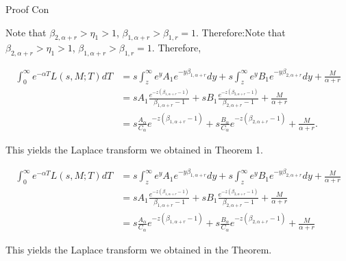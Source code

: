 \documentclass{beamer}
\begin{document}
\begin{frame}{Proof Con}

    {\footnotesize \footnotesize
    \par Note that \(\beta_{2,\alpha+r} > \eta_1 > 1\), \(\beta_{1,\alpha+r} > \beta_{1,r} = 1\). Therefore:Note that \(\beta_{2,\alpha+r} > \eta_1 > 1\), \(\beta_{1,\alpha+r} > \beta_{1,r} = 1\). Therefore,

\begin{align*}
\int_{0}^{\infty} e^{-\alpha T} L(s, M; T) dT 
&= s \int_{z}^{\infty} e^{y} A_1 e^{-y\beta_{1,\alpha+r}} dy + s \int_{z}^{\infty} e^{y} B_1 e^{-y\beta_{2,\alpha+r}} dy + \frac{M}{\alpha + r} \\
&= s A_1 \frac{e^{-z(\beta_{1,\alpha+r}-1)}}{\beta_{1,\alpha+r}-1} + s B_1 \frac{e^{-z(\beta_{2,\alpha+r}-1)}}{\beta_{2,\alpha+r}-1} + \frac{M}{\alpha + r} \\
&= s \frac{A_{\alpha}}{C_{\alpha}} e^{-z(\beta_{1,\alpha+r}-1)} + s \frac{B_{\alpha}}{C_{\alpha}} e^{-z(\beta_{2,\alpha+r}-1)} + \frac{M}{\alpha + r}.
\end{align*}

This yields the Laplace transform we obtained in Theorem 1.

    \begin{align*}
    \int_{0}^{\infty} e^{-\alpha T} L(s, M; T) dT 
    &= s \int_{z}^{\infty} e^{y} A_1 e^{-y\beta_{1,\alpha+r}} dy + s \int_{z}^{\infty} e^{y} B_1 e^{-y\beta_{2,\alpha+r}} dy + \frac{M}{\alpha + r} \\
    &= s A_1 \frac{e^{-z(\beta_{1,\alpha+r}-1)}}{\beta_{1,\alpha+r}-1} + s B_1 \frac{e^{-z(\beta_{2,\alpha+r}-1)}}{\beta_{2,\alpha+r}-1} + \frac{M}{\alpha + r} \\
    &= s \frac{A_{\alpha}}{C_{\alpha}} e^{-z(\beta_{1,\alpha+r}-1)} + s \frac{B_{\alpha}}{C_{\alpha}} e^{-z(\beta_{2,\alpha+r}-1)} + \frac{M}{\alpha + r}
    \end{align*}

    \par This yields the Laplace transform we obtained in the Theorem.
    }
    
\end{frame}



    
\end{document}
